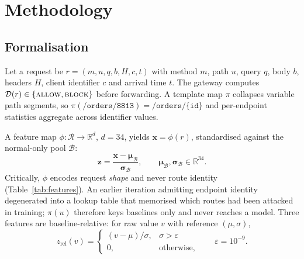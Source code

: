 \documentclass[conference]{IEEEtran}
\begin{document}
\section{Methodology}
\label{sec:method}
\subsection{Formalisation}
Let a request be $r=(m,u,q,b,H,c,t)$ with method $m$, path $u$, query $q$, body $b$, headers
$H$, client identifier $c$ and arrival time $t$. The gateway computes
$\mathcal{D}(r)\in\{\textsc{allow},\textsc{block}\}$ before forwarding. A template map $\pi$
collapses variable path segments, so
$\pi(\texttt{/orders/8813})=\texttt{/orders/\{id\}}$ and per-endpoint statistics aggregate
across identifier values.

A feature map $\phi:\mathcal{R}\rightarrow\mathbb{R}^{d}$, $d=34$, yields
$\mathbf{x}=\phi(r)$, standardised against the normal-only pool $\mathcal{B}$:
\begin{equation}
\mathbf{z}=\frac{\mathbf{x}-\boldsymbol{\mu}_{\mathcal{B}}}
{\boldsymbol{\sigma}_{\mathcal{B}}},\qquad
\boldsymbol{\mu}_{\mathcal{B}},\boldsymbol{\sigma}_{\mathcal{B}}\in\mathbb{R}^{34}.
\label{eq:standardise}
\end{equation}
Critically, $\phi$ encodes request \emph{shape} and never route identity
(Table~\ref{tab:features}). An earlier iteration admitting endpoint identity degenerated into
a lookup table that memorised which routes had been attacked in training; $\pi(u)$ therefore
keys baselines only and never reaches a model. Three features are baseline-relative: for raw
value $v$ with reference $(\mu,\sigma)$,
\begin{equation}
z_{\text{rel}}(v)=
\begin{cases}
(v-\mu)/\sigma, & \sigma > \varepsilon\\
0, & \text{otherwise,}
\end{cases}
\qquad \varepsilon=10^{-9}.
\label{eq:relz}
\end{equation}
\end{document}
